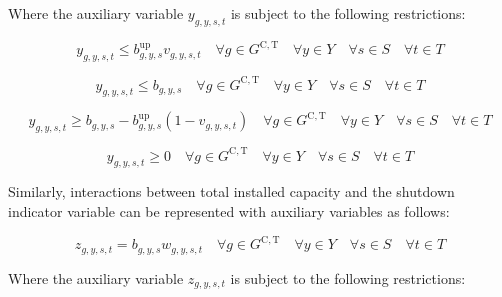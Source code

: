 \documentclass{article}
\newcommand{\sGeneratorsCandidateThermal}{G^{\mathrm{C,T}}}
\newcommand{\sYears}{Y}
\newcommand{\sScenarios}{S}
\newcommand{\sIntervals}{T}
\newcommand{\iGenerator}{g}
\newcommand{\iYear}{y}
\newcommand{\iScenario}{s}
\newcommand{\iInterval}{t}
\newcommand{\vStartupIndicator}[1][\iGenerator,\iYear,\iScenario,\iInterval]{v_{#1}}
\newcommand{\vShutdownIndicator}[1][\iGenerator,\iYear,\iScenario,\iInterval]{w_{#1}}
\newcommand{\vInstalledCapacityTotalScenario}[1][\iGenerator,\iYear,\iScenario]{b_{#1}}
\newcommand{\vInstalledCapacityStartupStateAux}[1][\iGenerator,\iYear,\iScenario,\iInterval]{y_{#1}}
\newcommand{\vInstalledCapacityShutdownStateAux}[1][\iGenerator,\iYear,\iScenario,\iInterval]{z_{#1}}
\begin{document}
Where the auxiliary variable $\vInstalledCapacityStartupStateAux$ is subject to the following restrictions:

\begin{equation}
\vInstalledCapacityStartupStateAux \leq \vInstalledCapacityTotalScenario^{\mathrm{up}} \vStartupIndicator \quad \forall \iGenerator \in \sGeneratorsCandidateThermal \quad \forall \iYear \in \sYears \quad \forall \iScenario \in \sScenarios \quad \forall \iInterval \in \sIntervals
\label{eqn: startup state aux variable block start}
\end{equation}

\begin{equation}
\vInstalledCapacityStartupStateAux \leq \vInstalledCapacityTotalScenario \quad \forall \iGenerator \in \sGeneratorsCandidateThermal \quad \forall \iYear \in \sYears \quad \forall \iScenario \in \sScenarios \quad \forall \iInterval \in \sIntervals
\end{equation}

\begin{equation}
\vInstalledCapacityStartupStateAux \geq \vInstalledCapacityTotalScenario - \vInstalledCapacityTotalScenario^{\mathrm{up}} \left(1 - \vStartupIndicator \right) \quad \forall \iGenerator \in \sGeneratorsCandidateThermal \quad \forall \iYear \in \sYears \quad \forall \iScenario \in \sScenarios \quad \forall \iInterval \in \sIntervals
\end{equation}

\begin{equation}
\vInstalledCapacityStartupStateAux \geq 0 \quad \forall \iGenerator \in \sGeneratorsCandidateThermal \quad \forall \iYear \in \sYears \quad \forall \iScenario \in \sScenarios \quad \forall \iInterval \in \sIntervals
\label{eqn: startup state aux variable block end}
\end{equation}

Similarly, interactions between total installed capacity and the shutdown indicator variable can be represented with auxiliary variables as follows:

\begin{equation}
\vInstalledCapacityShutdownStateAux = \vInstalledCapacityTotalScenario \vShutdownIndicator \quad \forall \iGenerator \in \sGeneratorsCandidateThermal \quad \forall \iYear \in \sYears \quad \forall \iScenario \in \sScenarios \quad \forall \iInterval \in \sIntervals
\end{equation}

Where the auxiliary variable $\vInstalledCapacityShutdownStateAux$ is subject to the following restrictions:
\end{document}
